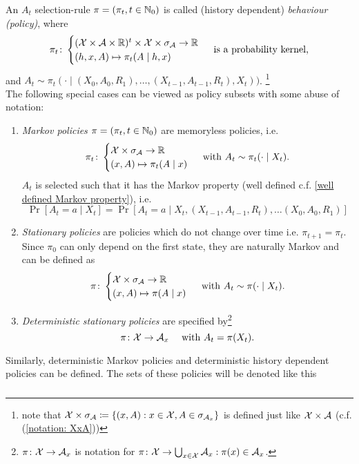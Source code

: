 \begin{definition} 
	An \(A_t\) selection-rule \(\pi=(\pi_t,t\in\mathbb{N}_0)\) is called (history dependent) \emph{behaviour (policy)}, where
	\[ 
		\pi_t\colon
		\begin{cases}
			(\mathcal{X}\times\mathcal{A}\times\mathbb{R})^t\times\mathcal{X}\times\sigma_{\mathcal{A}} \to \mathbb{R} \\
			(h,x,A)\mapsto \pi_t(A\mid h,x)
		\end{cases} \text{ is a probability kernel,}
	\]
	and \(A_t\sim \pi_t(\cdot\mid (X_0,A_0,R_1), \dots,(X_{t-1},A_{t-1},R_t),X_t))\).
	\footnote{ 
		note that \(\mathcal{X}\times\sigma_{\mathcal{A}}\coloneqq \{(x,A): x\in\mathcal{X}, A\in\sigma_{\mathcal{A}_x} \} \) is defined just like \(\mathcal{X}\times\mathcal{A}\) (c.f. (\ref{notation: XxA}))
	 } \\
	The following special cases can be viewed as policy subsets with some abuse of notation:
	\begin{enumerate}
		\item \emph{Markov policies} \(\pi=(\pi_t,t\in\mathbb{N}_0)\) are memoryless policies, i.e.
		\[
			\pi_t\colon
			\begin{cases}
				\mathcal{X}\times\sigma_{\mathcal{A}} \to \mathbb{R} \\
				(x,A)\mapsto \pi_t(A\mid x)
			\end{cases} 
			\text{ with } A_t\sim \pi_t(\cdot\mid X_t).
		\]
		\(A_t\) is selected such that it has the Markov property (well defined c.f. \ref{well defined Markov property}), i.e.
		\[\Pr[A_t=a\mid X_t]=\Pr[A_t=a\mid X_t, (X_{t-1},A_{t-1},R_t), \dots (X_0,A_0,R_1)] \]
		\item \emph{Stationary policies} are policies which do not change over time i.e. \(\pi_{t+1}=\pi_t\). Since \(\pi_0\) can only depend on the first state, they are naturally Markov and can be defined as
		\[
			\pi\colon 
			\begin{cases}
				\mathcal{X}\times\sigma_{\mathcal{A}}\to\mathbb{R}\\
				(x,A)\mapsto \pi(A\mid x)
			\end{cases} 
			\text{ with } A_t\sim\pi(\cdot\mid X_t).
		\]
		\item \emph{Deterministic stationary policies} are specified by\footnote{
			\(\pi\colon\mathcal{X}\to\mathcal{A}_x\) is notation for \(\pi\colon\mathcal{X}\to\bigcup_{x\in\mathcal{X}} \mathcal{A}_x : \pi(x)\in\mathcal{A}_x \).
		}
		\[
			\pi\colon\mathcal{X}\to\mathcal{A}_x \quad\text{ with }A_t=\pi(X_t).
		\]
	\end{enumerate}
	Similarly, deterministic Markov policies and deterministic history dependent policies can be defined. The sets of these policies will be denoted like this
	\[
	\begin{tikzcd}[row sep = small, column sep = small]

\end{tikzcd}\]
\end{definition}
